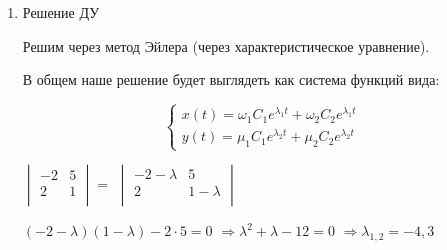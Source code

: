 \begin{enumerate}
    \item Решение ДУ

    Решим через метод Эйлера (через характеристическое уравнение).

    В общем наше решение будет выглядеть как система функций вида:

    \begin{equation*}
        \begin{cases}
            x(t) = \omega_1 C_1 e^{\lambda_1t} + \omega_2 C_2 e^{\lambda_1t}
            \\
            y(t) = \mu_1 C_1 e^{\lambda_2t} + \mu_2 C_2 e^{\lambda_2t}
        \end{cases}
    \end{equation*}


    $\displaystyle \begin{vmatrix}
                       -2 & 5 \\
                       2  & 1 \\
    \end{vmatrix} = $
    $\displaystyle \begin{vmatrix}
                       -2 - \lambda & 5           \\
                       2            & 1 - \lambda \\
    \end{vmatrix} $

    $(-2-\lambda)(1-\lambda) - 2 \cdot 5 = 0$
    $\Rightarrow \lambda^2 + \lambda - 12 = 0$
    $\Rightarrow \lambda_{1,2} = -4, 3$

    \begin{multicols}{2}
    \end{multicols}


\end{enumerate}
